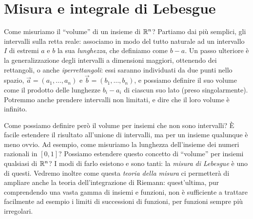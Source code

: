 \chapter{Misura e integrale di Lebesgue}
Come misuriamo il ``volume'' di un insieme di $\mathbb{R}^n$?
Partiamo dai più semplici, gli intervalli sulla retta reale: associamo in modo del tutto naturale ad un intervallo $I$ di estremi $a$ e $b$ la sua \emph{lunghezza}, che definiamo come $b-a$.
Un passo ulteriore è la generalizzazione degli intervalli a dimensioni maggiori, ottenendo dei rettangoli, o anche \emph{iperrettangoli}: essi saranno individuati da due punti nello spazio, $\vec a=(a_1,\dots,a_n)$ e $\vec b=(b_1,\dots,b_n)$, e possiamo definire il suo volume come il prodotto delle lunghezze $b_i-a_i$ di ciascun suo lato (preso singolarmente).
Potremmo anche prendere intervalli non limitati, e dire che il loro volume è infinito.

Come possiamo definire però il volume per insiemi che non sono intervalli?
È facile estendere il risultato all'unione di intervalli, ma per un insieme qualunque è meno ovvio.
Ad esempio, come misuriamo la lunghezza dell'insieme dei numeri razionali in $[0,1]$?
Possiamo estendere questo concetto di ``volume'' per insiemi qualsiasi di $\mathbb{R}^n$?
I modi di farlo esistono e sono tanti: la \emph{misura di Lebesgue} è uno di questi.
Vedremo inoltre come questa \emph{teoria della misura} ci permetterà di ampliare anche la teoria dell'integrazione di Riemann: quest'ultima, pur comprendendo una vasta gamma di insiemi e funzioni, non è sufficiente a trattare facilmente ad esempio i limiti di successioni di funzioni, per funzioni sempre più irregolari.

